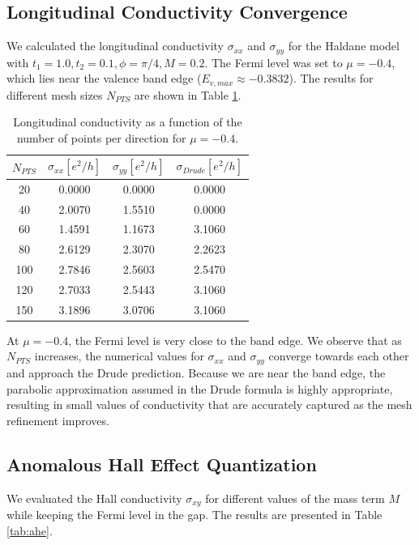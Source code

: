 \documentclass[12pt,a4paper]{article}
\begin{document}
\subsection{Longitudinal Conductivity Convergence}
We calculated the longitudinal conductivity $\sigma_{xx}$ and $\sigma_{yy}$ for the Haldane model with $t_1=1.0, t_2=0.1, \phi=\pi/4, M=0.2$. The Fermi level was set to $\mu=-0.4$, which lies near the valence band edge ($E_{v,max} \approx -0.3832$). The results for different mesh sizes $N_{PTS}$ are shown in Table \ref{tab:conductivity}.

\begin{table}[h]
    \centering
    \begin{tabular}{|c|c|c|c|}
        \hline
        $N_{PTS}$ & $\sigma_{xx} [e^2/h]$ & $\sigma_{yy} [e^2/h]$ & $\sigma_{Drude} [e^2/h]$ \\
        \hline
        20  & 0.0000 & 0.0000 & 0.0000 \\
        40  & 2.0070 & 1.5510 & 0.0000 \\
        60  & 1.4591 & 1.1673 & 3.1060 \\
        80  & 2.6129 & 2.3070 & 2.2623 \\
        100 & 2.7846 & 2.5603 & 2.5470 \\
        120 & 2.7033 & 2.5443 & 3.1060 \\
        150 & 3.1896 & 3.0706 & 3.1060 \\
        \hline
    \end{tabular}
    \caption{Longitudinal conductivity as a function of the number of points per direction for $\mu=-0.4$.}
    \label{tab:conductivity}
\end{table}

At $\mu=-0.4$, the Fermi level is very close to the band edge. We observe that as $N_{PTS}$ increases, the numerical values for $\sigma_{xx}$ and $\sigma_{yy}$ converge towards each other and approach the Drude prediction. Because we are near the band edge, the parabolic approximation assumed in the Drude formula is highly appropriate, resulting in small values of conductivity that are accurately captured as the mesh refinement improves.

\subsection{Anomalous Hall Effect Quantization}
We evaluated the Hall conductivity $\sigma_{xy}$ for different values of the mass term $M$ while keeping the Fermi level in the gap. The results are presented in Table \ref{tab:ahe}.
\end{document}
